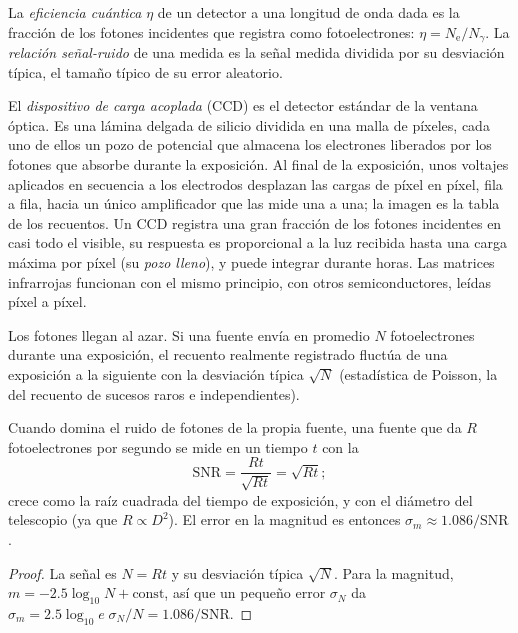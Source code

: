 \begin{definition}\label{def:b1:observing-the-sky:detector}
La \emph{eficiencia cuántica} $\eta$ de un detector a una
longitud de onda dada es la fracción de los fotones incidentes que registra como
fotoelectrones: $\eta = N_\mathrm{e}/N_\gamma$. La \emph{relación señal-ruido}
de una medida es la señal medida dividida por su desviación típica, el tamaño típico de
su error aleatorio.
\end{definition}

El \emph{dispositivo de carga acoplada} (CCD) es el detector estándar de la ventana
óptica. Es una lámina delgada de silicio dividida en una malla de píxeles, cada uno de
ellos un pozo de potencial que almacena los electrones liberados por los fotones que
absorbe durante la exposición. Al final de la exposición, unos voltajes aplicados en
secuencia a los electrodos desplazan las cargas de píxel en píxel, fila a fila, hacia un
único amplificador que las mide una a una; la imagen es la tabla de los recuentos. Un
CCD registra una gran fracción de los fotones incidentes en casi todo el visible, su
respuesta es proporcional a la luz recibida hasta una carga máxima por píxel (su
\emph{pozo lleno}), y puede integrar durante horas. Las matrices
infrarrojas funcionan con el mismo principio, con otros semiconductores, leídas píxel a
píxel.

Los fotones llegan al azar. Si una fuente envía en promedio $N$ fotoelectrones durante
una exposición, el recuento realmente registrado fluctúa de una exposición a la
siguiente con la desviación típica $\sqrt N$ (estadística de Poisson, la del recuento de
sucesos raros e independientes).

\begin{proposition}\label{prop:b1:observing-the-sky:snr}
Cuando domina el ruido de fotones de la propia fuente, una fuente que da $R$
fotoelectrones por segundo se mide en un tiempo $t$ con la 
\[
  \mathrm{SNR} = \frac{Rt}{\sqrt{Rt}} = \sqrt{Rt} ;
\]
crece como la raíz cuadrada del tiempo de exposición, y con el diámetro del
telescopio (ya que $R \propto D^2$). El error en la magnitud es entonces
$\sigma_m \approx 1.086/\mathrm{SNR}$.
\end{proposition}

\begin{proof}
La señal es $N = Rt$ y su desviación típica $\sqrt N$. Para la magnitud,
$m = -2.5\log_{10}N + \text{const}$, así que un pequeño error $\sigma_N$ da
$\sigma_m = 2.5\log_{10}e\;\sigma_N/N = 1.086/\mathrm{SNR}$.
\end{proof}

